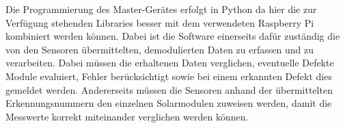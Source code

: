 Die  Programmierung  des  Master-Ger\"ates  erfolgt  in  Python  da  hier  die
zur  Verf\"ugung  stehenden Libraries  besser  mit  dem verwendeten  Raspberry
Pi  kombiniert  werden k\"onnen. Dabei  ist  die  Software einerseits  daf\"ur
zust\"andig  die  von den  Sensoren  \"ubermittelten,  demodulierten Daten  zu
erfassen und  zu verarbeiten. Dabei m\"ussen die  erhaltenen Daten verglichen,
eventuelle Defekte  Module evaluiert, Fehler ber\"ucksichtigt  sowie bei einem
erkannten  Defekt dies  gemeldet  werden. Andererseits  m\"ussen die  Sensoren
anhand  der  \"ubermittelten   Erkennungsnummern  den  einzelnen  Solarmodulen
zuweisen  werden, damit  die Messwerte  korrekt miteinander  verglichen werden
k\"onnen.
